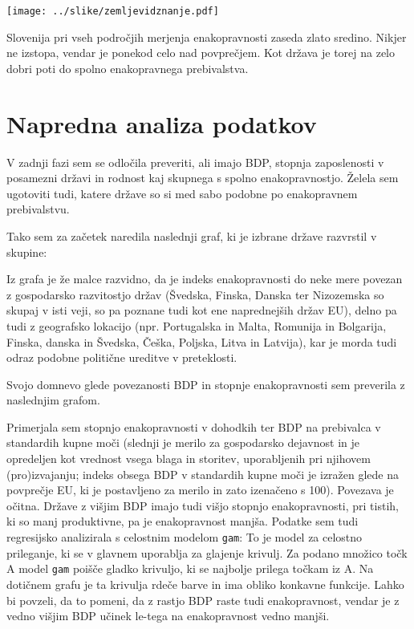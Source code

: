 \documentclass[11pt,a4paper]{article}
\begin{document}
\texttt{[image: ../slike/zemljevidznanje.pdf]}

Slovenija pri vseh področjih merjenja enakopravnosti zaseda zlato sredino. Nikjer ne izstopa, vendar je ponekod celo nad povprečjem. Kot država je torej na zelo dobri poti do spolno enakopravnega prebivalstva.



\section{Napredna analiza podatkov}
V zadnji fazi sem se odločila preveriti, ali imajo BDP, stopnja zaposlenosti v posamezni državi in rodnost kaj skupnega s spolno enakopravnostjo. Želela sem ugotoviti tudi, katere države so si med sabo podobne po enakopravnem prebivalstvu.

Tako sem za začetek naredila naslednji graf, ki je izbrane države razvrstil v skupine:

Iz grafa je že malce razvidno, da je indeks enakopravnosti do neke mere povezan z gospodarsko razvitostjo držav (Švedska, Finska, Danska ter Nizozemska so skupaj v isti veji, so pa poznane tudi kot ene naprednejših držav EU), delno pa tudi z geografsko lokacijo (npr. Portugalska in Malta, Romunija in Bolgarija, Finska, danska in Švedska, Češka, Poljska, Litva in Latvija), kar je morda tudi odraz podobne politične ureditve v preteklosti.

Svojo domnevo glede povezanosti BDP in stopnje enakopravnosti sem preverila z naslednjim grafom. 

Primerjala sem stopnjo enakopravnosti v dohodkih ter BDP na prebivalca v standardih kupne moči (slednji je merilo za gospodarsko dejavnost in je opredeljen kot vrednost vsega blaga in storitev, uporabljenih pri njihovem (pro)izvajanju; indeks obsega BDP v standardih kupne moči je izražen glede na povprečje EU, ki je postavljeno za merilo in zato izenačeno s 100).  
Povezava je očitna. Države z višjim BDP imajo tudi višjo stopnjo enakopravnosti, pri tistih, ki so manj produktivne, pa je enakopravnost manjša. Podatke sem tudi regresijsko analizirala s celostnim modelom \verb-gam-: To je model za celostno prileganje, ki se v glavnem uporablja za glajenje krivulj. Za podano množico točk A model \verb-gam- poišče gladko krivuljo, ki se najbolje prilega točkam iz A. Na dotičnem grafu je ta krivulja rdeče barve in ima obliko konkavne funkcije. Lahko bi povzeli, da to pomeni, da z rastjo BDP raste tudi enakopravnost, vendar je z vedno višjim BDP učinek le-tega na enakopravnost vedno manjši.
\end{document}
